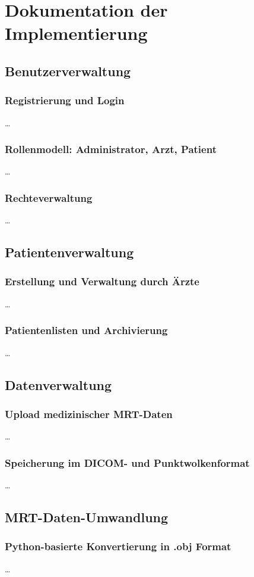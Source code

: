 \section{Dokumentation der Implementierung}
\subsection{Benutzerverwaltung}
\subsubsection{Registrierung und Login}
\ldots
\subsubsection{Rollenmodell: Administrator, Arzt, Patient}
\ldots
\subsubsection{Rechteverwaltung}
\ldots
\subsection{Patientenverwaltung}
\subsubsection{Erstellung und Verwaltung durch Ärzte}
\ldots
\subsubsection{Patientenlisten und Archivierung}
\ldots
\subsection{Datenverwaltung}
\subsubsection{Upload medizinischer MRT-Daten}
\ldots
\subsubsection{Speicherung im DICOM- und Punktwolkenformat}
\ldots
\subsection{MRT-Daten-Umwandlung}
\subsubsection{Python-basierte Konvertierung in .obj Format}
\ldots

